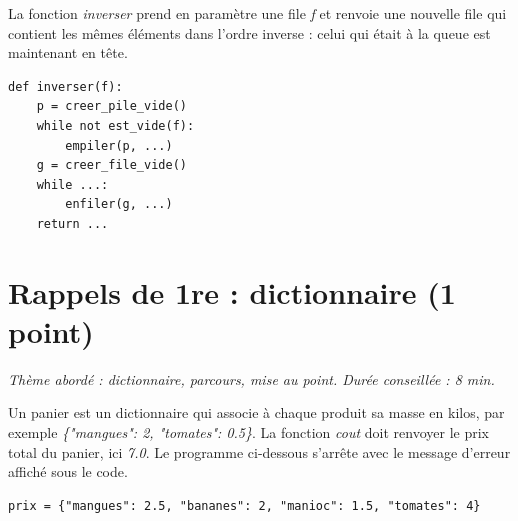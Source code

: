 \documentclass[a4paper, noanswers, addpoints, 12pt]{exam}
\begin{document}
\begin{questions}
\question La fonction \textit{inverser} prend en paramètre une file \textit{f} et renvoie une nouvelle file qui contient les mêmes éléments dans l'ordre inverse : celui qui était à la queue est maintenant en tête.
\par\noindent\begin{minipage}{\linewidth}
\begin{lstlisting}
def inverser(f):
    p = creer_pile_vide()
    while not est_vide(f):
        empiler(p, ...)
    g = creer_file_vide()
    while ...:
        enfiler(g, ...)
    return ...
\end{lstlisting}
\end{minipage}\par
{}

\section{Rappels de 1re : dictionnaire (1 point)}
\begin{center}\textit{Thème abordé : dictionnaire, parcours, mise au point. Durée conseillée : 8 min.}\end{center}

Un panier est un dictionnaire qui associe à chaque produit sa masse en kilos, par exemple \textit{\{"mangues": 2, "tomates": 0.5\}}. La fonction \textit{cout} doit renvoyer le prix total du panier, ici \textit{7.0}. Le programme ci-dessous s'arrête avec le message d'erreur affiché sous le code.
\par\noindent\begin{minipage}{\linewidth}
\begin{lstlisting}[basicstyle=\ttfamily\footnotesize]
prix = {"mangues": 2.5, "bananes": 2, "manioc": 1.5, "tomates": 4}


\end{lstlisting}
\end{minipage}
\end{questions}
\end{document}
